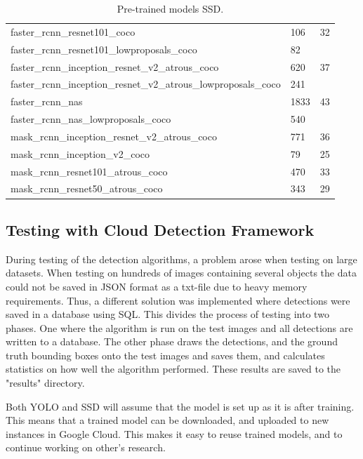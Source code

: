 \begin{table}[h!]
\begin{tabular}{lll}
faster\_rcnn\_resnet101\_coco                                   & 106         & 32                                \\
faster\_rcnn\_resnet101\_lowproposals\_coco                     & 82          &                                   \\
faster\_rcnn\_inception\_resnet\_v2\_atrous\_coco               & 620         & 37                                \\
faster\_rcnn\_inception\_resnet\_v2\_atrous\_lowproposals\_coco & 241         &                                   \\
faster\_rcnn\_nas                                               & 1833        & 43                                \\
faster\_rcnn\_nas\_lowproposals\_coco                           & 540         &                                   \\
mask\_rcnn\_inception\_resnet\_v2\_atrous\_coco                 & 771         & 36                                \\
mask\_rcnn\_inception\_v2\_coco                                 & 79          & 25                                \\
mask\_rcnn\_resnet101\_atrous\_coco                             & 470         & 33                                \\
mask\_rcnn\_resnet50\_atrous\_coco                              & 343         & 29                               
\end{tabular}
\caption{Pre-trained models SSD.}
\label{ssd_tab}
\end{table}


\newpage

\subsection{Testing with Cloud Detection Framework}
During testing of the detection algorithms, a problem arose when testing on large datasets. When testing on hundreds of images containing several objects the data could not be saved in JSON format as a txt-file due to heavy memory requirements. Thus, a different solution was implemented where detections were saved in a database using SQL. This divides the process of testing into two phases. One where the algorithm is run on the test images and all detections are written to a database. The other phase draws the detections, and the ground truth bounding boxes onto the test images and saves them, and calculates statistics on how well the algorithm performed. These results are saved to the "results" directory.

\vspace{3mm}

\noindent
Both YOLO and SSD will assume that the model is set up as it is after training. This means that a trained model can be downloaded, and uploaded to new instances in Google Cloud. This makes it easy to reuse trained models, and to continue working on other's research.









\cleardoublepage